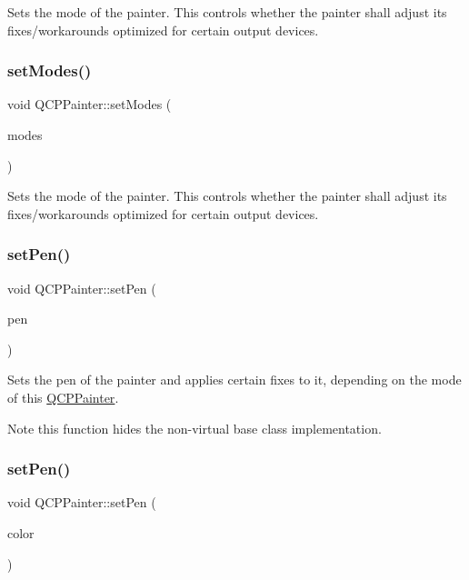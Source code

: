 Sets the mode of the painter. This controls whether the painter shall adjust its fixes/workarounds optimized for certain output devices. \mbox{\label{class_q_c_p_painter_a5fac93adc29c7c4dea9f3e171e9e635e}} 
\subsubsection{\texorpdfstring{setModes()}{setModes()}}
{\footnotesize\ttfamily void Q\+C\+P\+Painter\+::set\+Modes (\begin{DoxyParamCaption}\item[{Painter\+Modes}]{modes }\end{DoxyParamCaption})}

Sets the mode of the painter. This controls whether the painter shall adjust its fixes/workarounds optimized for certain output devices. \mbox{\label{class_q_c_p_painter_af9c7a4cd1791403901f8c5b82a150195}} 
\subsubsection{\texorpdfstring{setPen()}{setPen()}\hspace{0.1cm}{\footnotesize\ttfamily [1/3]}}
{\footnotesize\ttfamily void Q\+C\+P\+Painter\+::set\+Pen (\begin{DoxyParamCaption}\item[{const Q\+Pen \&}]{pen }\end{DoxyParamCaption})}

Sets the pen of the painter and applies certain fixes to it, depending on the mode of this \mbox{\hyperlink{class_q_c_p_painter}{Q\+C\+P\+Painter}}.

\begin{DoxyNote}{Note}
this function hides the non-\/virtual base class implementation. 
\end{DoxyNote}
\mbox{\label{class_q_c_p_painter_a5c4d88f21564e156e88ef807f7cf0003}} 
\subsubsection{\texorpdfstring{setPen()}{setPen()}\hspace{0.1cm}{\footnotesize\ttfamily [2/3]}}
{\footnotesize\ttfamily void Q\+C\+P\+Painter\+::set\+Pen (\begin{DoxyParamCaption}\item[{const Q\+Color \&}]{color }\end{DoxyParamCaption})}

